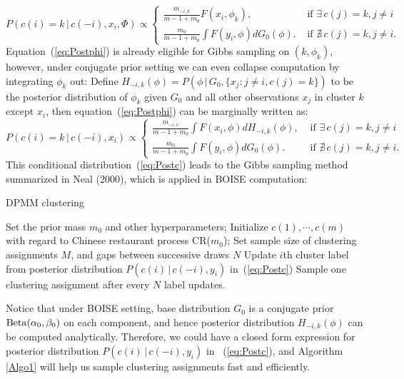 \documentclass[12pt]{article}
\begin{document}
\begin{equation}\label{eq:Postphi}
P(c(i) = k\,|\, c(-i), x_i, \Phi) \propto \begin{cases}
		\frac{m_{-i,k}}{m-1+m_0}F(x_i,\phi_k), &\text{ if }
	    \exists \, c(j) = k, j\neq i\\
		\frac{m_0}{m-1+m_0}\int F(y_i,\phi)dG_0(\phi). & \text{ if }
		\nexists \, c(j)= k, j \neq i.
	\end{cases}
\end{equation}
Equation~(\ref{eq:Postphi}) is already eligible for Gibbs sampling on $(k, \phi_k)$, however, under conjugate prior setting we can even collapse computation by integrating $\phi_k$ out: Define $H_{-i,k}(\phi) = P\left(\phi\,|\,G_0,\{x_j:j\neq i, c(j)= k\} \right)$ to be the posterior distribution of $\phi_k$ given $G_0$ and all other observations $x_j$ in cluster $k$ except $x_i$, then equation~(\ref{eq:Postphi}) can be marginally written as:
\begin{equation}\label{eq:Postc}
P(c(i) = k\,|\, c(-i), x_i) \propto \begin{cases}
		\frac{m_{-i,c}}{m-1+m_0}\int F(x_i,\phi)dH_{-i,k}(\phi), &\text{ if }
	    \exists \, c(j) = k, j\neq i\\
		\frac{m_0}{m-1+m_0}\int F(y_i,\phi)dG_0(\phi). & \text{ if }
		\nexists \, c(j)= k, j \neq i.
	\end{cases}
\end{equation}
This conditional distribution~(\ref{eq:Postc}) leads to the Gibbs sampling method summarized in Neal (2000), which is applied in BOISE computation:

\begin{algorithm}
\caption{DPMM clustering}\label{Algo1}
\begin{algorithmic}[1]
\State Set the prior mass $m_0$ and other hyperparameters;
\State Initialize $c(1),\cdots,c(m)$ with regard to Chinese restaurant process CR($m_0$);
\State Set sample size of clustering assignments $M$, and gaps between successive draws $N$
        \State Update $i$th cluster label from posterior distribution $P(c(i)\,|\,c(-i),y_i)$ in~(\ref{eq:Postc})
    \EndFor
\State Sample one clustering assignment after every $N$ label updates.
\EndWhile
\end{algorithmic}
\end{algorithm}

Notice that under BOISE setting, base distribution $G_0$ is a conjugate prior ${\rm Beta}(\alpha_0,\beta_0)$ on each component, and hence posterior distribution $H_{-i,k}(\phi)$ can be computed analytically. Therefore, we could have a closed form expression for posterior distribution $P(c(i)\,|\,c(-i),y_i)$ in ~(\ref{eq:Postc}), and Algorithm \ref{Algo1} will help us sample clustering assignments fast and efficiently. 
\end{document}
